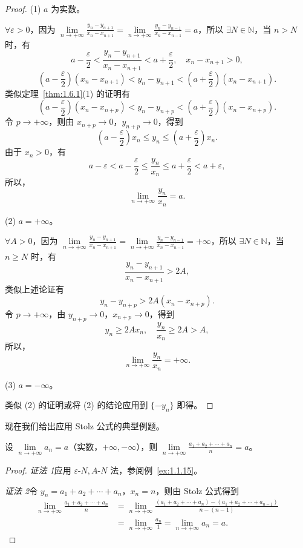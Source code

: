 \begin{proof}
(1) $a$ 为实数。

$\forall \varepsilon > 0$，因为 $\lim\limits_{n\to+\infty} \frac{y_n - y_{n+1}}{x_n - x_{n+1}} = \lim\limits_{n\to+\infty} \frac{y_n - y_{n-1}}{x_n - x_{n-1}} = a$，所以 $\exists N \in \mathbb{N}$，当 $n > N$ 时，有
\[
a - \frac{\varepsilon}{2} < \frac{y_n - y_{n+1}}{x_n - x_{n+1}} < a + \frac{\varepsilon}{2},\quad x_n - x_{n+1} > 0,
\]
\[
\left(a - \frac{\varepsilon}{2}\right)(x_n - x_{n+1}) < y_n - y_{n+1} < \left(a + \frac{\varepsilon}{2}\right)(x_n - x_{n+1}).
\]
类似定理~\ref{thm:1.6.1}(1) 的证明有
\[
\left(a - \frac{\varepsilon}{2}\right)(x_n - x_{n+p}) < y_n - y_{n+p} < \left(a + \frac{\varepsilon}{2}\right)(x_n - x_{n+p}).
\]
令 $p \to +\infty$，则由 $x_{n+p} \to 0$，$y_{n+p} \to 0$，得到
\[
\left(a - \frac{\varepsilon}{2}\right)x_n \leqslant y_n \leqslant \left(a + \frac{\varepsilon}{2}\right)x_n.
\]
由于 $x_n > 0$，有
\[
a - \varepsilon < a - \frac{\varepsilon}{2} \leqslant \frac{y_n}{x_n} \leqslant a + \frac{\varepsilon}{2} < a + \varepsilon,
\]
所以，
\[
\lim_{n\to+\infty} \frac{y_n}{x_n} = a.
\]

(2) $a = +\infty$。

$\forall A > 0$，因为 $\lim\limits_{n\to+\infty} \frac{y_n - y_{n+1}}{x_n - x_{n+1}} = \lim\limits_{n\to+\infty} \frac{y_n - y_{n-1}}{x_n - x_{n-1}} = +\infty$，所以 $\exists N \in \mathbb{N}$，当 $n \geqslant N$ 时，有
\[
\frac{y_n - y_{n+1}}{x_n - x_{n+1}} > 2A,
\]
类似上述论证有
\[
y_n - y_{n+p} > 2A(x_n - x_{n+p}).
\]
令 $p \to +\infty$，由 $y_{n+p} \to 0$，$x_{n+p} \to 0$，得到
\[
y_n \geqslant 2A x_n,\quad \frac{y_n}{x_n} \geqslant 2A > A,
\]
所以，
\[
\lim_{n\to+\infty} \frac{y_n}{x_n} = +\infty.
\]

(3) $a = -\infty$。

类似 (2) 的证明或将 (2) 的结论应用到 $\{-y_n\}$ 即得。
\end{proof}

现在我们给出应用 Stolz 公式的典型例题。

\begin{example}\label{ex:1.6.1}
设 $\lim\limits_{n\to+\infty} a_n = a$（实数，$+\infty, -\infty$），则 $\lim\limits_{n\to+\infty} \frac{a_1 + a_2 + \cdots + a_n}{n} = a$。
\end{example}

\begin{proof}
\textit{证法 1}\quad 应用 $\varepsilon\text{-}N, A\text{-}N$ 法，参阅例~\ref{ex:1.1.15}。

\textit{证法 2}\quad 令 $y_n = a_1 + a_2 + \cdots + a_n$，$x_n = n$，则由 Stolz 公式得到
\begin{align*}
\lim_{n\to+\infty} \frac{a_1 + a_2 + \cdots + a_n}{n} &= \lim_{n\to+\infty} \frac{(a_1 + a_2 + \cdots + a_n) - (a_1 + a_2 + \cdots + a_{n-1})}{n - (n - 1)}\\
&= \lim_{n\to+\infty} \frac{a_n}{1} = \lim_{n\to+\infty} a_n = a.
\end{align*}
\end{proof}

